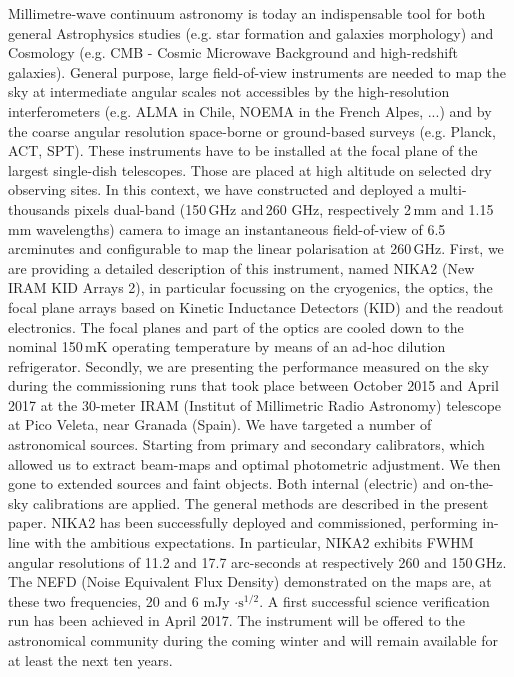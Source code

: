 \documentclass[]{aa} %
\begin{document}
  \abstract
   {Millimetre-wave continuum astronomy is today an indispensable tool for both general Astrophysics studies (e.g. star formation and galaxies morphology) and Cosmology (e.g. CMB - Cosmic Microwave Background and high-redshift galaxies). General purpose, large field-of-view instruments are needed to map the sky at intermediate angular scales not accessibles by the high-resolution interferometers (e.g. ALMA in Chile, NOEMA in the French Alpes, ...) and by the coarse angular resolution space-borne or ground-based surveys (e.g. Planck, ACT, SPT). These instruments have to be installed at the focal plane of the largest single-dish telescopes. Those are placed at high altitude on selected dry observing sites. In this context, we have constructed and deployed a multi-thousands pixels dual-band (150\,GHz and\,260 GHz, respectively 2\,mm and 1.15\,mm wavelengths) camera to image an instantaneous field-of-view of 6.5\,arcminutes and configurable to map the linear polarisation at 260\,GHz.}
   {First, we are providing a detailed description of this instrument, named NIKA2 (New IRAM KID Arrays 2), in particular focussing on the cryogenics, the optics, the focal plane arrays based on Kinetic Inductance Detectors (KID) and the readout electronics. The focal planes and part of the optics are cooled down to the nominal 150\,mK operating temperature by means of an ad-hoc dilution refrigerator. 
Secondly, we are presenting the performance measured on the sky during the commissioning runs that took place between October 2015 and April 2017 at the 30-meter IRAM (Institut of Millimetric Radio Astronomy) telescope at Pico Veleta, near Granada (Spain).}
   {We have targeted a number of astronomical sources. Starting from primary and secondary calibrators, which allowed us to extract beam-maps and optimal photometric adjustment. We then gone to extended sources and faint objects. Both internal (electric) and on-the-sky calibrations are applied. The general methods are described in the present paper.}
   {NIKA2 has been successfully deployed and commissioned, performing in-line with the ambitious expectations. In particular, NIKA2 exhibits FWHM angular resolutions of 11.2 and 17.7 arc-seconds at respectively 260 and 150\,GHz. The NEFD (Noise Equivalent Flux Density) demonstrated on the maps are, at these two frequencies, 20 and 6 mJy $\cdot\textrm{s}^{1/2}$. A first successful science verification run has been achieved in April 2017. The instrument will be offered to the astronomical community during the coming winter and will remain available for at least the next ten years.}
  {}
\end{document}
